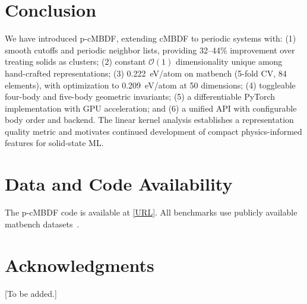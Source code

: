 \documentclass[twocolumn]{article}
\begin{document}
\section{Conclusion}

We have introduced p-cMBDF, extending cMBDF to periodic systems with:
(1) smooth cutoffs and periodic neighbor lists, providing 32--44\% improvement over treating solids as clusters;
(2) constant $\mathcal{O}(1)$ dimensionality unique among hand-crafted representations;
(3) 0.222~eV/atom on matbench (5-fold CV, 84 elements), with optimization to 0.209~eV/atom at 50 dimensions;
(4) toggleable four-body and five-body geometric invariants;
(5) a differentiable PyTorch implementation with GPU acceleration; and
(6) a unified API with configurable body order and backend.
The linear kernel analysis establishes a representation quality metric and motivates continued development of compact physics-informed features for solid-state ML.

\section*{Data and Code Availability}
The p-cMBDF code is available at \url{[URL]}. All benchmarks use publicly available matbench datasets~\cite{dunn2020}.

\section*{Acknowledgments}
[To be added.]
\end{document}
